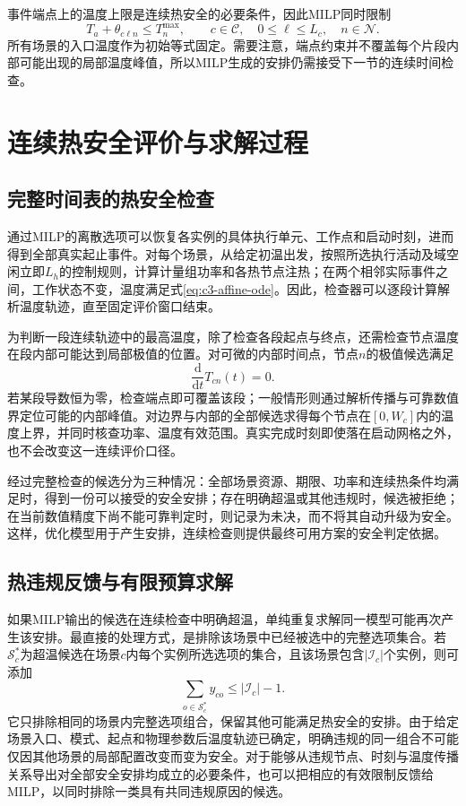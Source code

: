 事件端点上的温度上限是连续热安全的必要条件，因此MILP同时限制
\begin{equation}
 T_a+\theta_{c\ell n}\le T_n^{\max},
 \qquad c\in\mathcal C,\quad 0\le\ell\le L_c,\quad n\in\mathcal N.
 \label{eq:c3-endpoint}
\end{equation}
所有场景的入口温度作为初始等式固定。需要注意，端点约束并不覆盖每个片段内部可能出现的局部温度峰值，所以MILP生成的安排仍需接受下一节的连续时间检查。

\section{连续热安全评价与求解过程}

\subsection{完整时间表的热安全检查}

通过MILP的离散选项可以恢复各实例的具体执行单元、工作点和启动时刻，进而得到全部真实起止事件。对每个场景，从给定初温出发，按照所选执行活动及域空闲立即$L_h$的控制规则，计算计量组功率和各热节点注热；在两个相邻实际事件之间，工作状态不变，温度满足式\eqref{eq:c3-affine-ode}。因此，检查器可以逐段计算解析温度轨迹，直至固定评价窗口结束。

为判断一段连续轨迹中的最高温度，除了检查各段起点与终点，还需检查节点温度在段内部可能达到局部极值的位置。对可微的内部时间点，节点$n$的极值候选满足
\begin{equation}
 \frac{\mathrm d}{\mathrm dt}T_{cn}(t)=0.
 \label{eq:c3-stationary}
\end{equation}
若某段导数恒为零，检查端点即可覆盖该段；一般情形则通过解析传播与可靠数值界定位可能的内部峰值。对边界与内部的全部候选求得每个节点在$[0,W_c]$内的温度上界，并同时核查功率、温度有效范围。真实完成时刻即使落在启动网格之外，也不会改变这一连续评价口径。

经过完整检查的候选分为三种情况：全部场景资源、期限、功率和连续热条件均满足时，得到一份可以接受的安全安排；存在明确超温或其他违规时，候选被拒绝；在当前数值精度下尚不能可靠判定时，则记录为未决，而不将其自动升级为安全。这样，优化模型用于产生安排，连续检查则提供最终可用方案的安全判定依据。

\subsection{热违规反馈与有限预算求解}

如果MILP输出的候选在连续检查中明确超温，单纯重复求解同一模型可能再次产生该安排。最直接的处理方式，是排除该场景中已经被选中的完整选项集合。若$\mathcal S_c^*$为超温候选在场景$c$内每个实例所选选项的集合，且该场景包含$|\mathcal I_c|$个实例，则可添加
\begin{equation}
 \sum_{o\in\mathcal S_c^*}y_{co}
       \le |\mathcal I_c|-1.
 \label{eq:c3-no-good}
\end{equation}
它只排除相同的场景内完整选项组合，保留其他可能满足热安全的安排。由于给定场景入口、模式、起点和物理参数后温度轨迹已确定，明确违规的同一组合不可能仅因其他场景的局部配置改变而变为安全。对于能够从违规节点、时刻与温度传播关系导出对全部安全安排均成立的必要条件，也可以把相应的有效限制反馈给MILP，以同时排除一类具有共同违规原因的候选。

